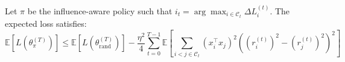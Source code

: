 \begin{tcolorbox}[colback=lightpurple, colframe=lightpurple, sharp corners=all, boxrule=0mm, boxsep=0.5mm, left=1.5mm, right=1.5mm, top=1.5mm, bottom=1.5mm]
\begin{theorem}
Let $\pi$ be the influence-aware policy such that $i_t = \arg\max_{i \in \mathcal{C}_t} \Delta L_i^{(t)}$. The expected loss satisfies:
\begin{equation}
    \mathbb{E}[L(\theta^{(T)}_\pi)] \leq \mathbb{E}[L(\theta^{(T)}_{\text{rand}})] - \frac{\eta^2}{4} \sum_{t=0}^{T-1} \mathbb{E}\left[\sum_{i<j \in \mathcal{C}_t} (x_i^\top x_j)^2 \left((r_i^{(t)})^2 - (r_j^{(t)})^2\right)^2\right]
\end{equation}
\end{theorem}
\end{tcolorbox}
